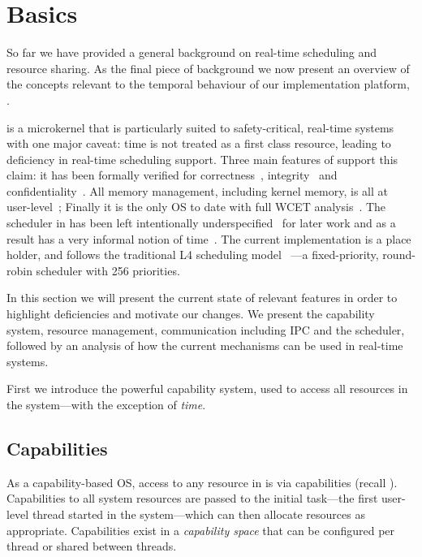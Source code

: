 

\chapter{\selfour Basics}
\label{chap:sel4}

So far we have provided a general background on real-time scheduling and resource sharing.
As the final piece of background we now present an overview of the concepts relevant to the temporal behaviour of our implementation platform, \selfour.

\selfour is a microkernel that is particularly suited to safety-critical, real-time systems with one
major caveat: time is not treated as a first class resource, leading to deficiency in real-time
scheduling support.  Three main features of \selfour support this claim: it has been formally
verified for correctness~\citep{Klein_AEMSKH_14}, integrity~\citep{Sewell_WGMAK_11}
and confidentiality~\citep{Murray_MBGBSLGK_13}.
All memory management, including kernel memory, is all at user-level~\citep{Elkaduwe_Derrin_06};
Finally it is the only \gls{OS} to date with full \gls{WCET} analysis~\citep{Sewell_KH_16}.
The scheduler in \selfour has been left intentionally underspecified~\citep{Petters_EH_12} for later
work and as a result has a very informal notion of time~\citep{Elphinstone_Heiser_13}.
The current implementation is a place holder, and follows the traditional L4 scheduling model~\citep{Ruocco_06} ---a fixed-priority, round-robin scheduler with 256 priorities.

In this section we will present the current state of relevant \selfour features in order to
highlight deficiencies and motivate our changes.  We present the capability system, resource
management, communication including \gls{IPC} and the scheduler, followed by an analysis of
how the current mechanisms can be used in real-time systems.

First we introduce the powerful \selfour capability system, used to access all resources in the
system---with the exception of \emph{time}.

\section{Capabilities}
\label{s:capabilities}

As a capability-based \gls{OS}, access to any resource in \selfour is via capabilities (recall
). Capabilities to all system resources are passed to the initial task---the first
user-level thread started in the system---which can then allocate resources as appropriate.
Capabilities exist in a \emph{capability space} that can be configured per thread or shared between
threads. 

